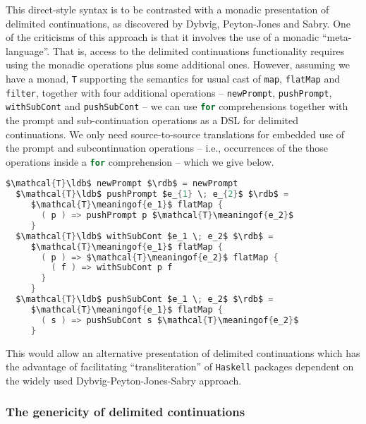 This direct-style syntax is to be contrasted with a monadic
presentation of delimited continuations, as discovered by Dybvig,
Peyton-Jones and Sabry. One of the criticisms of this approach is that
it involves the use of a monadic ``meta-language''. That is, access to
the delimited continuations functionality requires using the monadic
operations plus some additional ones. However, assuming we have a
monad, \lstinline[language=Scala,mathescape=true]!T! supporting the
semantics for usual cast of
\lstinline[language=Scala,mathescape=true]!map!,
\lstinline[language=Scala,mathescape=true]!flatMap! and
\lstinline[language=Scala,mathescape=true]!filter!, together with four
additional operations --
\lstinline[language=Scala,mathescape=true]!newPrompt!,
\lstinline[language=Scala,mathescape=true]!pushPrompt!,
\lstinline[language=Scala,mathescape=true]!withSubCont! and
\lstinline[language=Scala,mathescape=true]!pushSubCont! -- we can use
\lstinline[language=Scala,mathescape=true]!for!  comprehensions
together with the prompt and sub-continuation operations as a DSL for
delimited continuations. We only need source-to-source translations
for embedded use of the prompt and subcontinuation operations -- i.e.,
occurrences of the those operations inside a
\lstinline[language=Scala,mathescape=true]!for! comprehension -- which
we give below.

\break

\begin{lstlisting}[language=Scala,mathescape=true]    
  $\mathcal{T}\ldb$ newPrompt $\rdb$ = newPrompt
  $\mathcal{T}\ldb$ pushPrompt $e_{1} \; e_{2}$ $\rdb$ =
     $\mathcal{T}\meaningof{e_1}$ flatMap {
       ( p ) => pushPrompt p $\mathcal{T}\meaningof{e_2}$
     }
  $\mathcal{T}\ldb$ withSubCont $e_1 \; e_2$ $\rdb$ =
     $\mathcal{T}\meaningof{e_1}$ flatMap {
       ( p ) => $\mathcal{T}\meaningof{e_2}$ flatMap {
         ( f ) => withSubCont p f
       }
     }
  $\mathcal{T}\ldb$ pushSubCont $e_1 \; e_2$ $\rdb$ =
     $\mathcal{T}\meaningof{e_1}$ flatMap {
       ( s ) => pushSubCont s $\mathcal{T}\meaningof{e_2}$
     }
\end{lstlisting}

This would allow an alternative presentation of delimited
continuations which has the advantage of facilitating
``transliteration'' of \texttt{Haskell} packages dependent on the
widely used Dybvig-Peyton-Jones-Sabry approach.

\subsubsection{The genericity of delimited continuations}

